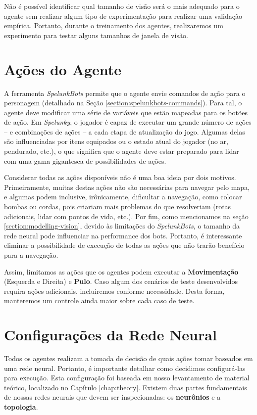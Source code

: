 
Não é possível identificar qual tamanho de visão será o mais adequado para o
agente sem realizar algum tipo de experimentação para realizar uma validação
empírica. Portanto, durante o treinamento dos agentes, realizaremos um
experimento para testar alguns tamanhos de janela de visão.


\section{\label{section:modelling-outputs}Ações do Agente}
A ferramenta \textit{SpelunkBots} permite que o agente envie comandos de ação
para o personagem (detalhado na Seção \ref{section:spelunkbots-commands}). Para
tal, o agente deve modificar uma série de variáveis que estão mapeadas para os
botões de ação. Em \textit{Spelunky}, o jogador é capaz de executar um grande
número de ações -- e combinações de ações -- a cada etapa de atualização do
jogo. Algumas delas são influenciadas por itens equipados ou o estado atual do
jogador (no ar, pendurado, etc.), o que significa que o agente deve estar
preparado para lidar com uma gama gigantesca de possibilidades de ações.

Considerar todas as ações disponíveis não é uma boa ideia por dois motivos.
Primeiramente, muitas destas ações não são necessárias para navegar pelo mapa, e
algumas podem inclusive, irônicamente, dificultar a navegação, como colocar
bombas ou cordas, pois criariam mais problemas do que resolveriam (rotas
adicionais, lidar com pontos de vida, etc.). Por fim, como mencionamos na seção
\ref{section:modelling-vision}, devido às limitações do \textit{SpelunkBots}, o
tamanho da rede neural pode influenciar na performance dos bots. Portanto, é
interessante eliminar a possibilidade de execução de todas as ações que não
trarão benefício para a navegação.

Assim, limitamos as ações que os agentes podem executar a \textbf{Movimentação}
(Esquerda e Direita) e \textbf{Pulo}. Caso algum dos cenários de teste
desenvolvidos requira ações adicionais, incluiremos conforme necessidade. Desta
forma, manteremos um controle ainda maior sobre cada caso de teste.


\section{\label{section:modelling-network}Configurações da Rede Neural}
Todos os agentes realizam a tomada de decisão de quais ações tomar baseados em
uma rede neural. Portanto, é importante detalhar como decidimos configurá-las
para execução. Esta configuração foi baseada em nosso levantamento de material
teórico, localizado no Capítulo \ref{chap:theory}. Existem duas partes
fundamentais de nossas redes neurais que devem ser inspecionadas: os
\textbf{neurônios} e a \textbf{topologia}.

